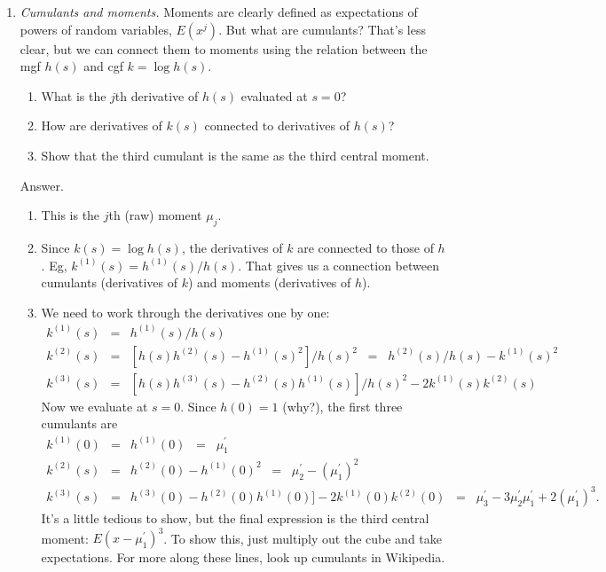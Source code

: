 \begin{enumerate}
\item {\it Cumulants and moments.\/}
Moments are clearly defined as expectations of powers of random variables, $E(x^j)$.
But what are cumulants?
That's less clear, but we can connect them to moments using the relation
between the mgf $h(s)$ and cgf $k = \log h(s)$.
\begin{enumerate}
\item What is the $j$th derivative of $h(s)$ evaluated at $s=0$?
\item How are derivatives of $k(s)$ connected to derivatives of $h(s)$?
\item Show that the third cumulant is the same as the third central moment.
\end{enumerate}
%
Answer.
\begin{enumerate}
\item This is the $j$th (raw) moment $\mu_j$.
\item Since $k(s) = \log h(s)$, the derivatives of $k$ are connected to those of $h$.
Eg, $k^{(1)}(s) =  h^{(1)}(s)/h(s) $.
That gives us a connection between cumulants (derivatives of $k$) and moments
(derivatives of $h$).
\item We need to work through the derivatives one by one:
\begin{eqnarray*}
    k^{(1)}(s) &=& h^{(1)}(s) / h(s)  \\
    k^{(2)}(s) &=& [h(s)h^{(2)}(s) - h^{(1)}(s)^2]/h(s)^2
            \;\;=\;\; h^{(2)}(s)/h(s) - k^{(1)}(s)^2 \\
    k^{(3)}(s) &=& [h(s)h^{(3)}(s) - h^{(2)}(s)h^{(1)}(s)]/h(s)^2 - 2 k^{(1)}(s) k^{(2)}(s)
\end{eqnarray*}
Now we evaluate at $s=0$.  Since $h(0) = 1$ (why?),
the first three cumulants are
\begin{eqnarray*}
    k^{(1)}(0) &=& h^{(1)}(0) \;\;=\;\; \mu_1^\prime  \\
    k^{(2)}(s) &=& h^{(2)}(0) - h^{(1)}(0)^2 \;\;=\;\; \mu_2^\prime - (\mu_1^\prime)^2 \\
    k^{(3)}(s) &=& h^{(3)}(0) - h^{(2)}(0)h^{(1)}(0)]
                    - 2 k^{(1)}(0) k^{(2)}(0)
               \;\;=\;\; \mu_3^\prime - 3 \mu_2^\prime \mu^\prime_1 + 2(\mu^\prime_1)^3 .
\end{eqnarray*}
It's a little tedious to show, but the final expression is the third
central moment:  $ E (x - \mu_1^\prime)^3$.
To show this, just multiply out the cube and take expectations.
For more along these lines, look up cumulants in Wikipedia.


\end{enumerate}
\end{enumerate}
